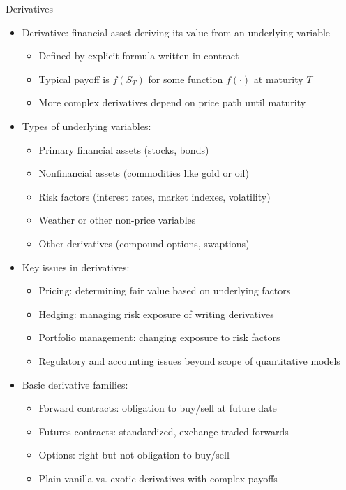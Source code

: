 \documentclass[10pt,handout]{beamer}
\begin{document}
\begin{frame}{Derivatives}
  \begin{itemize}[<+->]
    \item Derivative: financial asset deriving its value from an underlying variable
      \begin{itemize}
        \item Defined by explicit formula written in contract
        \item Typical payoff is $f(S_T)$ for some function $f(\cdot)$ at maturity $T$
        \item More complex derivatives depend on price path until maturity
      \end{itemize}
    \item Types of underlying variables:
      \begin{itemize}
        \item Primary financial assets (stocks, bonds)
        \item Nonfinancial assets (commodities like gold or oil)
        \item Risk factors (interest rates, market indexes, volatility)
        \item Weather or other non-price variables
        \item Other derivatives (compound options, swaptions)
      \end{itemize}
    \item Key issues in derivatives:
      \begin{itemize}
        \item Pricing: determining fair value based on underlying factors
        \item Hedging: managing risk exposure of writing derivatives
        \item Portfolio management: changing exposure to risk factors
        \item Regulatory and accounting issues beyond scope of quantitative models
      \end{itemize}
    \item Basic derivative families:
      \begin{itemize}
        \item Forward contracts: obligation to buy/sell at future date
        \item Futures contracts: standardized, exchange-traded forwards
        \item Options: right but not obligation to buy/sell
        \item Plain vanilla vs. exotic derivatives with complex payoffs
      \end{itemize}
  \end{itemize}
\end{frame}
\end{document}
